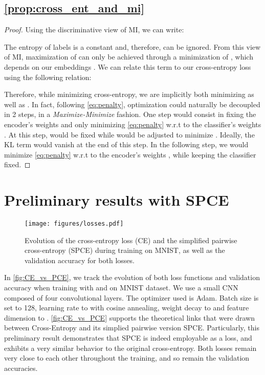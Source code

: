 \documentclass[runningheads]{llncs}
\begin{document}
    \subsection{\autoref{prop:cross_ent_and_mi}}\label{appendix:cross_ent_and_mi}
        \begin{proof}
            Using the discriminative view of MI, we can write:
            
            The entropy of labels  is a constant and, therefore, can be ignored. From this view of MI, maximization of  can only be achieved through a minimization of , which depends on our embeddings . We can relate this term to our cross-entropy loss using the following relation:
            
            Therefore, while minimizing cross-entropy, we are implicitly both minimizing  as well as .   In fact, following \autoref{eq:penalty}, optimization could naturally be decoupled in 2 steps, in a \textit{Maximize-Minimize} fashion. One step would consist in fixing the encoder's weights  and only minimizing \autoref{eq:penalty} w.r.t to the classifier's weights . At this step,  would be fixed while  would be adjusted to minimize . Ideally, the KL term would vanish at the end of this step. In the following step, we would minimize \autoref{eq:penalty} w.r.t to the encoder's weights , while keeping the classifier fixed.
        \end{proof}
        
        
\section{Preliminary results with SPCE}\label{appendix:spce_experiment}

\begin{figure}[H]
    \centering
    \texttt{[image: figures/losses.pdf]}
    \caption{Evolution of the cross-entropy loss (CE) and the simplified pairwise cross-entropy (SPCE) during training on MNIST, as well as the validation accuracy for both losses.}
    \label{fig:CE_vs_PCE}
\end{figure}


In \autoref{fig:CE_vs_PCE}, we track the evolution of both loss functions and validation accuracy when training with  and  on MNIST dataset. We use a small CNN composed of four convolutional layers. The optimizer used is Adam. Batch size is set to 128, learning rate to  with cosine annealing, weight decay to  and feature dimension to . \autoref{fig:CE_vs_PCE} supports the theoretical links that were drawn between Cross-Entropy and its simplied pairwise version SPCE. Particularly, this preliminary result demonstrates that SPCE is indeed employable as a loss, and exhibits a very similar behavior to the original cross-entropy. Both losses remain very close to each other throughout the training, and so remain the validation accuracies. 
\end{document}
